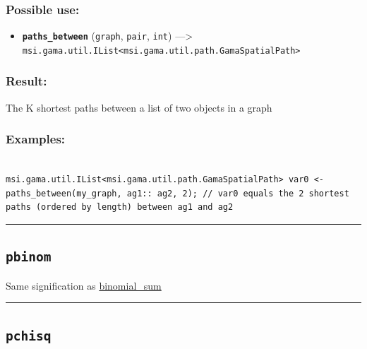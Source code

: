 \documentclass[]{book}
\providecommand{\tightlist}{%
  \setlength{\itemsep}{0pt}\setlength{\parskip}{0pt}}
\theoremstyle{definition}
\theoremstyle{definition}
\theoremstyle{definition}
\theoremstyle{remark}
\begin{document}
\subsubsection{Possible use:}\label{possible-use-397}

\begin{itemize}
\tightlist
\item
  \textbf{\texttt{paths\_between}} (\texttt{graph}, \texttt{pair},
  \texttt{int}) ---\textgreater{}
  \texttt{msi.gama.util.IList\textless{}msi.gama.util.path.GamaSpatialPath\textgreater{}}
\end{itemize}

\subsubsection{Result:}\label{result-383}

The K shortest paths between a list of two objects in a graph

\subsubsection{Examples:}\label{examples-273}

\begin{verbatim}
 
msi.gama.util.IList<msi.gama.util.path.GamaSpatialPath> var0 <- paths_between(my_graph, ag1:: ag2, 2); // var0 equals the 2 shortest paths (ordered by length) between ag1 and ag2
\end{verbatim}

\begin{center}\rule{0.5\linewidth}{\linethickness}\end{center}

\subsection{\texorpdfstring{\texttt{pbinom}}{pbinom}}\label{pbinom}

Same signification as
\href{operators-b-to-c.html\#binomial_sum}{binomial\_sum}

\begin{center}\rule{0.5\linewidth}{\linethickness}\end{center}

\subsection{\texorpdfstring{\texttt{pchisq}}{pchisq}}\label{pchisq}
\end{document}
